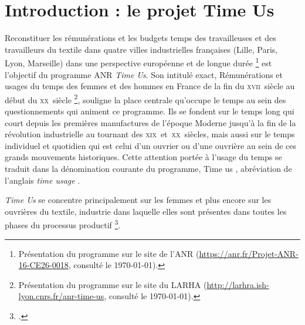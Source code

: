 \section*{Introduction : le projet Time Us}

\bigbreak

\og Reconstituer les rémunérations et les budgets temps des travailleuses et des travailleurs du textile dans quatre villes industrielles françaises (Lille, Paris, Lyon, Marseille) dans une perspective européenne et de longue durée \fg{}\footnote{Présentation du programme sur le site de l'ANR (\url{https://anr.fr/Projet-ANR-16-CE26-0018}, consulté le \today).} est l'objectif du programme ANR \textit{Time Us}. Son intitulé exact, \og Rémunérations et usages du temps des femmes et des hommes en France de la fin du \textsc{xvii}\ieme ~siècle au début du \textsc{xx}\ieme ~siècle \fg{}\footnote{Présentation du programme sur le site du LARHA (\url{http://larhra.ish-lyon.cnrs.fr/anr-time-us}, consulté le \today).}, souligne la place centrale qu'occupe le temps au sein des questionnements qui animent ce programme. Ils se fondent sur le temps long qui court depuis les premières manufactures de l'époque Moderne jusqu'à la fin de la révolution industrielle au tournant des \textsc{xix}\ieme  ~et~\textsc{xx}\ieme ~siècles, mais aussi sur le temps individuel et quotidien qui est celui d'un ouvrier ou d'une ouvrière au sein de ces grands mouvements historiques. Cette attention portée à l'usage du temps se traduit dans la dénomination courante du programme, \og Time us \fg{}, abréviation de l'anglais \og \textit{time usage} \fg{}.

\textit{Time Us} se concentre principalement sur les femmes et plus encore sur les ouvrières du textile, industrie dans laquelle \og elles sont présentes dans toutes les phases du processus productif \fg{}\footnote{\cite[p. 1]{inria}.}.

